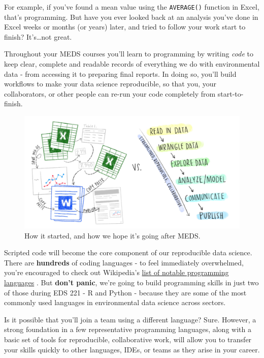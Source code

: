 \documentclass[
]{book}
\begin{document}
For example, if you've found a mean value using the \texttt{AVERAGE()} function in Excel, that's programming. But have you ever looked back at an analysis you've done in Excel weeks or months (or years) later, and tried to follow your work start to finish? It's\ldots not great.

Throughout your MEDS courses you'll learn to programming by writing \emph{code} to keep clear, complete and readable records of everything we do with environmental data - from accessing it to preparing final reports. In doing so, you'll build workflows to make your data science reproducible, so that you, your collaborators, or other people can re-run your code completely from start-to-finish.

\begin{figure}

{\centering \includegraphics[width=1\linewidth]{images/workflows} 

}

\caption{How it started, and how we hope it's going after MEDS.}\label{fig:unnamed-chunk-2}
\end{figure}

Scripted code will become the core component of our reproducible data science. There are \textbf{hundreds} of coding languages - to feel immediately overwhelmed, you're encouraged to check out Wikipedia's \href{https://en.wikipedia.org/wiki/List_of_programming_languages}{list of notable programming languages} \citep{enwiki_1014039839}. But \textbf{don't panic}, we're going to build programming skills in just two of those during EDS 221 - R and Python - because they are some of the most commonly used languages in environmental data science across sectors.

Is it possible that you'll join a team using a different language? Sure. However, a strong foundation in a few representative programming languages, along with a basic set of tools for reproducible, collaborative work, will allow you to transfer your skills quickly to other languages, IDEs, or teams as they arise in your career.
\end{document}
